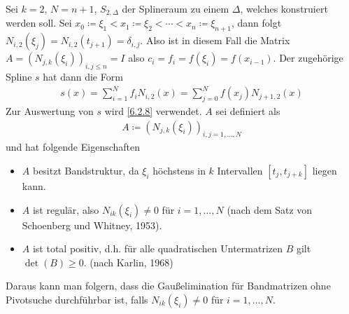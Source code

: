 \label{6.2.14}
Sei $k=2$, $N=n+1$, $S_{2,\Delta}$ der Splineraum zu einem $\Delta$,
welches konstruiert werden soll.
\label{im6.2.14}
Sei $x_0\coloneqq \xi_1<x_1\coloneqq \xi_2<\dotsb<x_n\coloneqq
\xi_{n+1}$, dann folgt $N_{i,2}(\xi_j)=N_{i,2}(t_{j+1})=\delta_{i,j}$.
Also ist in diesem Fall die Matrix $A=(N_{j,k}(\xi_i))_{i,j\leq n}=I$
also $c_i=f_i=f(\xi_i)=f(x_{i-1})$.
Der zugehörige Spline $s$ hat dann die Form
\begin{gather*}
  s(x) = \sum_{i=1}^{N}f_i N_{i,2}(x) 
  = \sum_{j=0}^{N}f(x_j)N_{j+1,2}(x)
\end{gather*}
Zur Auswertung von $s$ wird \ref{6.2.8} verwendet.
$A$ sei definiert als
\begin{gather*}
  A \coloneqq \left(N_{j,k}(\xi_i)\right)_{i,j=1,\dotsc,N}
\end{gather*}
und hat folgende Eigenschaften
\begin{itemize}
\item  $A$ besitzt Bandstruktur, da  $\xi_i$ höchstens in $k$
  Intervallen $[t_j, t_{j+k}]$ liegen kann.
\item $A$ ist regulär, also $N_{ik}(\xi_i)\neq 0$
  für $i=1, \dotsc, N$ (nach dem Satz von Schoenberg und Whitney, 1953).
\item $A$ ist total positiv, d.h. für alle quadratischen
  Untermatrizen $B$ gilt $\det(B)\geq 0$.
  (nach Karlin, 1968)
\end{itemize}

Daraus kann man folgern, dass
die Gaußelimination für Bandmatrizen ohne Pivotsuche
durchführbar ist, falls $N_{ik}(\xi_i) \neq 0$
für $i =1, \dotsc, N$.


